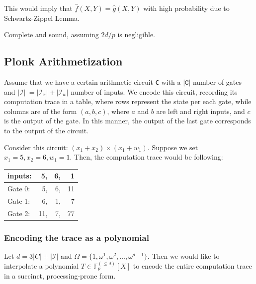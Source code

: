 \documentclass[../lecture-notes.tex]{subfiles}
\begin{document}
This would imply that \(\hat{f}(X,Y) = \hat{g}(X,Y)\) with high probability due to Schwartz-Zippel Lemma.

\begin{remark}
Complete and sound, assuming \(2d/p\) is negligible.
\end{remark}

\subsection{Plonk Arithmetization}

Assume that we have a certain arithmetic circuit \texttt{C} with a \(|\texttt{C}|\) number of gates and \(|\mathcal{I}|\ = |\mathcal{I}_x| + |\mathcal{I}_w|\) number of inputs. We encode this circuit, recording its computation trace in a table, where rows represent the state per each gate, while columns are of the form \((a, b, c)\), where \(a\) and \(b\) are left and right inputs, and \(c\) is the output of the gate. In this manner, the output of the last gate corresponds to the output of the circuit.

\begin{example}
Consider this circuit: \((x_1 + x_2)\times(x_1 + w_1)\). Suppose we set \(x_1 = 5, x_2 = 6, w_1 = 1\). Then, the computation trace would be following:

\begin{center}
\begin{tabular}{l rrr}
  inputs: & 5, & 6, & 1 \\ \hline
  Gate 0: & 5, & 6, & 11 \\
  Gate 1: & 6, & 1, & 7 \\
  Gate 2: & 11, & 7, & 77 \\ 
\end{tabular}
\end{center}
\end{example}

\subsubsection{Encoding the trace as a polynomial}

Let \(d = 3|C| + |\mathcal{I}|\) and \(\Omega = \{1, \omega^1, \omega^2, \dots, \omega^{d-1}\}\). Then we would like to interpolate a polynomial \(T \in \mathbb{F}_p^{(\leq d)}[X]\) to encode the entire computation trace in a succinct, processing-prone form.
\end{document}
